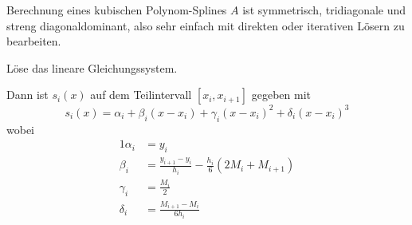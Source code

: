 \begin{defi}{Berechnung eines kubischen Polynom-Splines}
    $A$ ist symmetrisch, tridiagonale und streng diagonaldominant, also sehr einfach mit direkten oder iterativen Lösern zu bearbeiten. 
    
    Löse das lineare Gleichungssystem.
    
    Dann ist $s_i(x)$ auf dem Teilintervall $[x_i, x_{i+1}]$ gegeben mit
    \[ 
        s_i(x) = \alpha_i + \beta_i (x - x_{i}) + \gamma_i (x - x_{i})^2 + \delta_i (x - x_{i})^3
    \]
    wobei
    \begin{alignat*}{1}
        \alpha_i & = y_i                                                        \\ 
        \beta_i  & = \frac{y_{i+1} - y_i}{h_i} - \frac{h_i}{6} (2M_i + M_{i+1}) \\
        \gamma_i & = \frac{M_{i}}{2}                                            \\ 
        \delta_i & = \frac{M_{i+1} - M_{i}}{6 h_i}
    \end{alignat*}
\end{defi}

